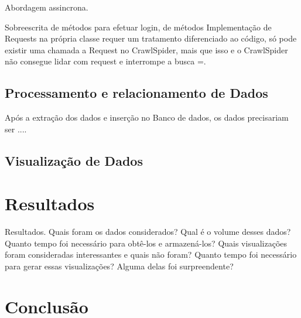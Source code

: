 \documentclass[12pt]{article}
\begin{document}
Abordagem assincrona.

Sobreescrita de métodos para efetuar login, de métodos
Implementação de Requests na própria classe requer um tratamento diferenciado ao código, só pode existir uma chamada a Request no CrawlSpider, mais que isso e o CrawlSpider não consegue lidar com request e interrompe a busca =.



\subsection{Processamento e relacionamento de Dados}

Após a extração dos dados e inserção no Banco de dados, os dados precisariam ser ....


\subsection{Visualização de Dados}

\section{Resultados}

Resultados.
Quais foram os dados considerados? Qual é o volume desses dados? Quanto tempo foi
necessário para obtê-los e armazená-los? Quais visualizações foram consideradas interessantes e quais não
foram? Quanto tempo foi necessário para gerar essas visualizações? Alguma delas foi surpreendente?


\section{Conclusão}



\begin{thebibliography}{2}

\end{thebibliography}
\end{document}
